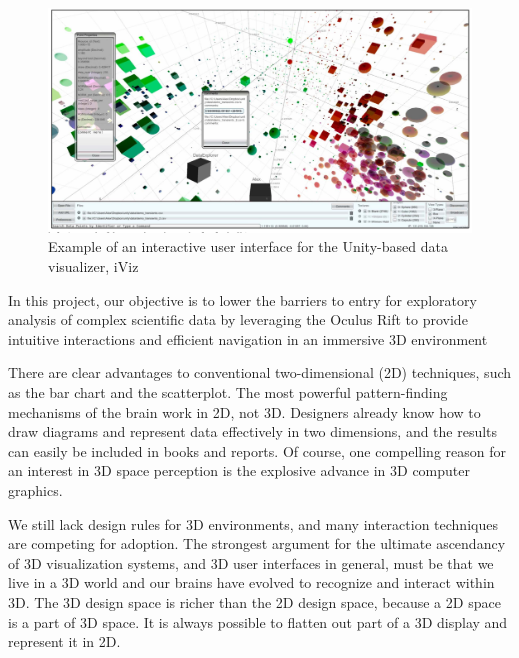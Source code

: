 \begin{figure}[h]
	\begin{center}
		\includegraphics[width=14cm]{03_Figures/05_LitReview/Donalek2014_iViz.png}
		\caption[Example of an interactive user interface for the Unity-based data visualizer, iViz]{Example of an interactive user interface for the Unity-based data visualizer, iViz \citep{Donalek2014}}
		\label{fig:iviz}
	\end{center}
\end{figure}


In this project, our objective is to lower the barriers to entry for exploratory analysis of complex scientific data by leveraging the Oculus Rift to provide intuitive interactions and efficient navigation in an immersive 3D environment
\cite{Drouhard2015}

There are clear advantages to conventional two-dimensional (2D) techniques, such as the bar chart and the scatterplot. The most powerful pattern-finding mechanisms of the brain work in 2D, not 3D. Designers already know how to draw diagrams and represent data effectively in two dimensions, and the results can easily be included in books and reports. Of course, one compelling reason for an interest in 3D space perception is the explosive advance in 3D computer graphics.
\cite{Ware2012}

We still lack design rules for 3D environments, and many interaction techniques are competing for adoption. The strongest argument for the ultimate ascendancy of 3D visualization systems, and 3D user interfaces in general, must be that we live in a 3D world and our brains have evolved to recognize and interact within 3D. The 3D design space is richer than the 2D design space, because a 2D space is a part of 3D space. It is always possible to flatten out part of a 3D display and represent it in 2D.
\cite{Ware2012}

